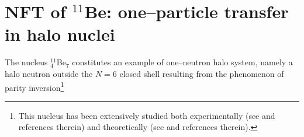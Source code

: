 \section{NFT of $^{11}$Be: one--particle transfer in halo nuclei}\label{C6S2}
 The nucleus $^{11}_4$Be$_7$ constitutes an example of one--neutron halo system, namely a halo neutron outside the $N=6$ closed shell resulting from the phenomenon of parity inversion\footnote{This nucleus has been extensively studied both experimentally (see \cite{Iwasaki:00,Fortier:99,Winfield:01,Auton:70,Zwieglinski:79,Schmitt:13,Nortershauser:09,Kwan:14}  and references therein) and theoretically (see \cite{Talmi:60,Otsuka:93,Sagawa:93,Vinh:95,Gori:04,Nunes:96,Fossez:16,Hamamoto:07,Kanada:02,Calci:16,Krieger:12,Timofeyuk:99,Keeley:04,Deltuva:09,Deltuva:13,Lay:14,deDiego:14} and references therein).}
 
